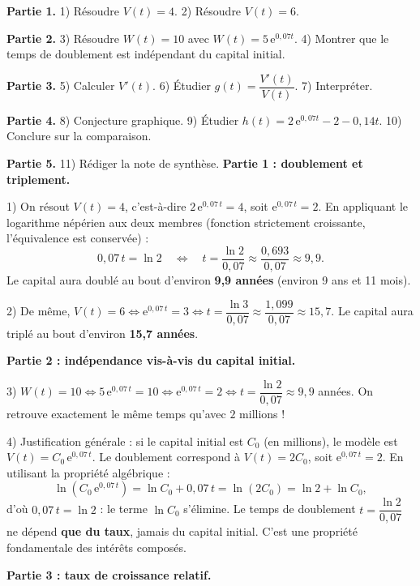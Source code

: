 \documentclass[11pt]{article}
\begin{document}
\begin{exoresolu}
\textbf{Partie 1.} 1) Résoudre $V(t)=4$. 2) Résoudre $V(t)=6$.

\textbf{Partie 2.} 3) Résoudre $W(t)=10$ avec $W(t)=5\,\mathrm{e}^{0{,}07t}$. 4) Montrer que le temps de doublement est indépendant du capital initial.

\textbf{Partie 3.} 5) Calculer $V'(t)$. 6) Étudier $g(t)=\dfrac{V'(t)}{V(t)}$. 7) Interpréter.

\textbf{Partie 4.} 8) Conjecture graphique. 9) Étudier $h(t)=2\,\mathrm{e}^{0{,}07t}-2-0{,}14t$. 10) Conclure sur la comparaison.

\textbf{Partie 5.} 11) Rédiger la note de synthèse.
\tcblower
\textbf{Partie 1 : doublement et triplement.}

1) On résout $V(t) = 4$, c'est-à-dire $2\,\mathrm{e}^{0{,}07\,t} = 4$, soit $\mathrm{e}^{0{,}07\,t} = 2$. En appliquant le logarithme népérien aux deux membres (fonction strictement croissante, l'équivalence est conservée) :
\[ 0{,}07\,t = \ln 2 \quad\Longleftrightarrow\quad t = \frac{\ln 2}{0{,}07} \approx \frac{0{,}693}{0{,}07} \approx 9{,}9. \]
Le capital aura doublé au bout d'environ \textbf{9,9 années} (environ 9 ans et 11 mois).

2) De même, $V(t) = 6 \iff \mathrm{e}^{0{,}07\,t} = 3 \iff t = \dfrac{\ln 3}{0{,}07} \approx \dfrac{1{,}099}{0{,}07} \approx 15{,}7$. Le capital aura triplé au bout d'environ \textbf{15,7 années}.

\textbf{Partie 2 : indépendance vis-à-vis du capital initial.}

3) $W(t) = 10 \iff 5\,\mathrm{e}^{0{,}07\,t} = 10 \iff \mathrm{e}^{0{,}07\,t} = 2 \iff t = \dfrac{\ln 2}{0{,}07} \approx 9{,}9$ années. On retrouve exactement le même temps qu'avec $2$ millions !

4) Justification générale : si le capital initial est $C_0$ (en millions), le modèle est $V(t) = C_0\,\mathrm{e}^{0{,}07\,t}$. Le doublement correspond à $V(t) = 2C_0$, soit $\mathrm{e}^{0{,}07\,t} = 2$. En utilisant la propriété algébrique :
\[ \ln\left(C_0\,\mathrm{e}^{0{,}07\,t}\right) = \ln C_0 + 0{,}07\,t = \ln(2C_0) = \ln 2 + \ln C_0, \]
d'où $0{,}07\,t = \ln 2$ : le terme $\ln C_0$ s'élimine. Le temps de doublement $t = \dfrac{\ln 2}{0{,}07}$ ne dépend \textbf{que du taux}, jamais du capital initial. C'est une propriété fondamentale des intérêts composés.

\textbf{Partie 3 : taux de croissance relatif.}


\end{exoresolu}
\end{document}
